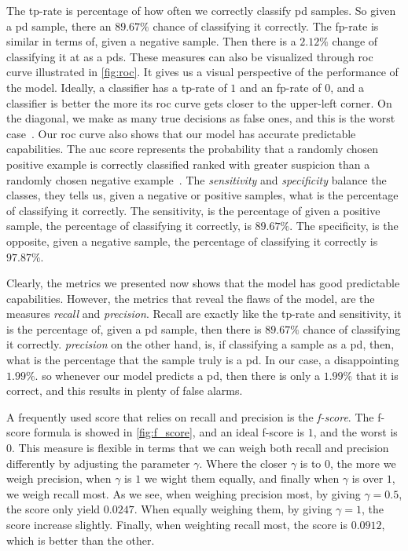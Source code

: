 The tp-rate is percentage of how often we correctly classify \ac{pd} samples. So given a \ac{pd} sample, there an $89.67\%$ chance of classifying it correctly. The fp-rate is similar in terms of, given a negative sample. Then there is a $2.12\%$ change of classifying it at as a \acp{pd}. These measures can also be visualized through \ac{roc} curve illustrated in \autoref{fig:roc}. It gives us a visual perspective of the performance of the model. Ideally, a classifier has a tp-rate of $1$ and an fp-rate of $0$, and a classifier is better the more its \ac{roc} curve gets closer to the upper-left corner. On the diagonal, we make as many true decisions as false ones, and this is the worst case~\cite[p.~563]{alpaydin2014introduction}. Our \ac{roc} curve also shows that our model has accurate predictable capabilities. The \ac{auc} score represents the probability that a randomly chosen positive example is correctly classified ranked with greater suspicion than a randomly chosen negative example~\cite{bradley1997use}.
The \emph{sensitivity} and \emph{specificity} balance the classes, they tells us, given a negative or positive samples, what is the percentage of classifying it correctly. The sensitivity, is the percentage of given a positive sample, the percentage of classifying it correctly, is $89.67\%$. The specificity, is the opposite, given a negative sample, the percentage of classifying it correctly is $97.87\%$. 

Clearly, the metrics we presented now shows that the model has good predictable capabilities. However, the metrics that reveal the flaws of the model, are the measures \emph{recall} and \emph{precision}. Recall are exactly like the tp-rate and sensitivity, it is the percentage of, given a \ac{pd} sample, then there is $89.67\%$ chance of classifying it correctly. \emph{precision} on the other hand, is, if classifying a sample as a \ac{pd}, then, what is the percentage that the sample truly is a \ac{pd}. In our case, a disappointing $1.99\%$. so whenever our model predicts a \ac{pd}, then there is only a $1.99\%$ that it is correct, and this results in plenty of false alarms.



A frequently used score that relies on recall and precision is the \emph{f-score}. The f-score formula is showed in \autoref{fig:f_score}, and an ideal f-score is $1$, and the worst is $0$. This measure is flexible in terms that we can weigh both recall and precision differently by adjusting the parameter $\gamma$. Where the closer $\gamma$ is to $0$, the more we weigh precision, when $\gamma$ is $1$ we wight them equally, and finally when $\gamma$ is over $1$, we weigh recall most. As we see, when weighing precision most, by giving  $\gamma=0.5$, the score only yield $0.0247$. When equally weighing them, by giving $\gamma=1$, the score increase slightly. Finally, when weighting recall most, the score is $0.0912$, which is better than the other.

